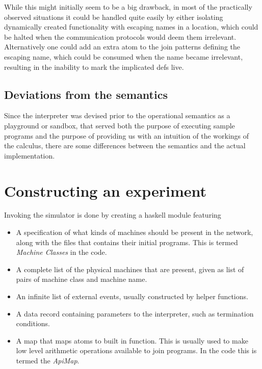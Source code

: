 While this might initially seem to be a big drawback, in most of the practically
observed situations it could be handled quite easily by either isolating
dynamically created functionality with escaping names in a location, which could
be halted when the communication protocols would deem them irrelevant.
Alternatively one could add an extra atom to the join patterns defining the
escaping name, which could be consumed when the name became irrelevant,
resulting in the inability to mark the implicated defs live.

\subsection*{Deviations from the semantics}
Since the interpreter was devised prior to the operational semantics as a
playground or sandbox, that served both the purpose of executing sample programs
and the purpose of providing us with an intuition of the workings of the
calculus, there are some differences between the semantics and the actual
implementation.

\section{Constructing an experiment}
Invoking the simulator is done by creating a haskell module featuring
\begin{itemize}

\item A specification of what kinds of machines should be present in the
network, along with the files that contains their initial programs. This is
termed \emph{Machine Classes} in the code.

\item A complete list of the physical machines that are present, given as list
of pairs of machine class and machine name.

\item An infinite list of external events, usually constructed by helper
functions.

\item A data record containing parameters to the interpreter, such as
termination conditions.

\item A map that maps atoms to built in function. This is usually used to make
low level arithmetic operations available to join programs. In the code this is
termed the \emph{ApiMap}.

\end{itemize}
